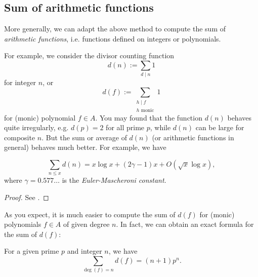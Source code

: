 \subsection{Sum of arithmetic functions}

More generally, we can adapt the above method to compute the sum of \emph{arithmetic functions}, i.e. functions defined on integers or polynomials.

For example, we consider the divisor counting function
\begin{equation}
    d(n) := \sum_{d \mid n} 1
    \label{eqn:divisor_counting_function}
\end{equation}
for integer $n$, or
\begin{equation}
    d(f) := \sum_{\substack{h \mid f \\ h\text{ monic}}} 1
    \label{eqn:divisor_counting_function_poly}
\end{equation}
for (monic) polynomial $f \in A$.
You may found that the function $d(n)$ behaves quite irregularly, e.g. $d(p) = 2$ for all prime $p$, while $d(n)$ can be large for composite $n$.
But the sum or average of $d(n)$ (or arithmetic functions in general) behaves much better.
For example, we have
\begin{theorem}[Dirichlet]
    \begin{equation}
        \sum_{n \le x} d(n) = x \log x  + (2\gamma - 1)x + O(\sqrt{x} \log x),
        \label{eqn:divisor_counting_function_asymptotic}
    \end{equation}
    where $\gamma = 0.577\dots$ is the \emph{Euler-Mascheroni constant}.
\end{theorem}
\begin{proof}
    See \cite[Theorem 3.3]{apostol2013introduction}.
\end{proof}
As you expect, it is much easier to compute the sum of $d(f)$ for (monic) polynomials $f \in A$ of given degree $n$.
In fact, we can obtain an exact formula for the sum of $d(f)$:
\begin{theorem}
    \label{thm:divisor_counting_function_poly}
    For a given prime $p$ and integer $n$, we have
    \begin{equation}
        \sum_{\deg(f) = n} d(f) = (n + 1) p^n.
        \label{eqn:divisor_counting_function_poly_formula}
    \end{equation}
\end{theorem}
